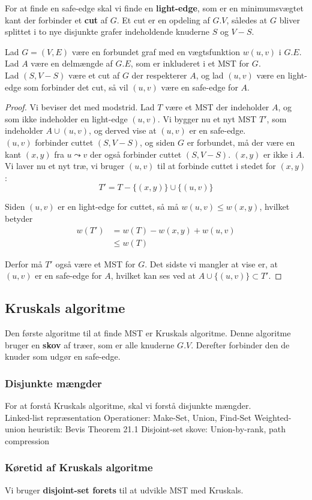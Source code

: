 For at finde en safe-edge skal vi finde en \textbf{light-edge}, som er en minimumsvægtet kant der forbinder et \textbf{cut} af $G$. Et cut er en opdeling af $G.V$, således at $G$ bliver splittet i to nye disjunkte grafer indeholdende knuderne $S$ og $V-S$.
\begin{theorem}
  Lad $G=(V,E)$ være en forbundet graf med en vægtsfunktion $w(u,v)$ i $G.E$. Lad $A$ være en delmængde af $G.E$, som er inkluderet i et MST for $G$.\\
  Lad $(S, V-S)$ være et cut af $G$ der respekterer $A$, og lad $(u,v)$ være en light-edge som forbinder det cut, så vil $(u,v)$ være en safe-edge for $A$.
\end{theorem}


\begin{proof}
  Vi beviser det med modstrid. Lad $T$ være et MST der indeholder $A$, og som ikke indeholder en light-edge $(u,v)$. Vi bygger nu et nyt MST $T'$, som indeholder $A \cup {(u,v)}$, og derved vise at $(u,v)$ er en safe-edge.\\

  $(u, v)$ forbinder cuttet $(S,V-S)$, og siden $G$ er forbundet, må der være en kant $(x,y)$ fra $u \leadsto v$ der også forbinder cuttet $(S,V-S)$. $(x,y)$ er ikke i $A$. Vi laver nu et nyt træ, vi bruger $(u,v)$ til at forbinde cuttet i stedet for $(x,y)$:
  $$T' = T - \{(x,y)\} \cup \{(u,v)\}$$
  
  Siden $(u,v)$ er en light-edge for cuttet, så må $w(u,v) \leq w(x,y)$, hvilket betyder
  \begin{align*}
    w(T') &= w(T) - w(x,y) + w(u,v)\\
          &\leq w(T)
  \end{align*}

  Derfor må $T'$ også være et MST for $G$. Det sidste vi mangler at vise er, at $(u,v)$ er en safe-edge for $A$, hvilket kan ses ved at $A \cup \{(u,v)\} \subset T'$.
\end{proof}

\subsection{Kruskals algoritme}
Den første algoritme til at finde MST er Kruskals algoritme. Denne algoritme bruger en \textbf{skov} af træer, som er alle knuderne $G.V$. Derefter forbinder den de knuder som udgør en safe-edge.

\subsubsection{Disjunkte mængder}
For at forstå Kruskals algoritme, skal vi forstå disjunkte mængder.\\
Linked-list repræsentation
Operationer: Make-Set, Union, Find-Set
Weighted-union heuristik: Bevis Theorem 21.1
Disjoint-set skove: Union-by-rank, path compression

\subsubsection{Køretid af Kruskals algoritme}
Vi bruger \textbf{disjoint-set forets} til at udvikle MST med Kruskals.\\



